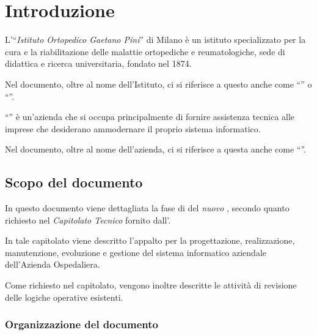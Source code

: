 \chapter{Introduzione}\label{ch:introduzione}
	
	L'``\textit{Istituto Ortopedico Gaetano Pini}''\cite{istituto} di Milano è un istituto specializzato per la cura e la riabilitazione delle malattie ortopediche e reumatologiche, sede di didattica e ricerca universitaria, fondato nel 1874.

	Nel documento, oltre al nome dell'Istituto, ci si riferisce a questo anche come ``\textit{\istituto}'' o  ``\textit{\proponente}''.
	
	``\textit{\azienda}''\cite{sito_azienda} è un'azienda che si occupa principalmente di fornire assistenza tecnica alle imprese che desiderano ammodernare il proprio sistema informatico.

	Nel documento, oltre al nome dell'azienda, ci si riferisce a questa anche come ``\textit{\offerente}''.

\section{Scopo del documento}\label{sec:scopo_documento}
	
	In questo documento viene dettagliata la fase di \textit{\rollout} del \textit{nuovo \helpdesk}, secondo quanto richiesto nel \textit{Capitolato Tecnico} fornito dall'\istituto.
	
	In tale capitolato viene descritto l'appalto per la progettazione, realizzazione, manutenzione, evoluzione e gestione del sistema informatico aziendale dell'Azienda Ospedaliera.
	
	Come richiesto nel capitolato, vengono inoltre descritte le attività di revisione delle logiche operative esistenti.
	
	\subsection{Organizzazione del documento}\label{sec:organizzazione_documento}
	

